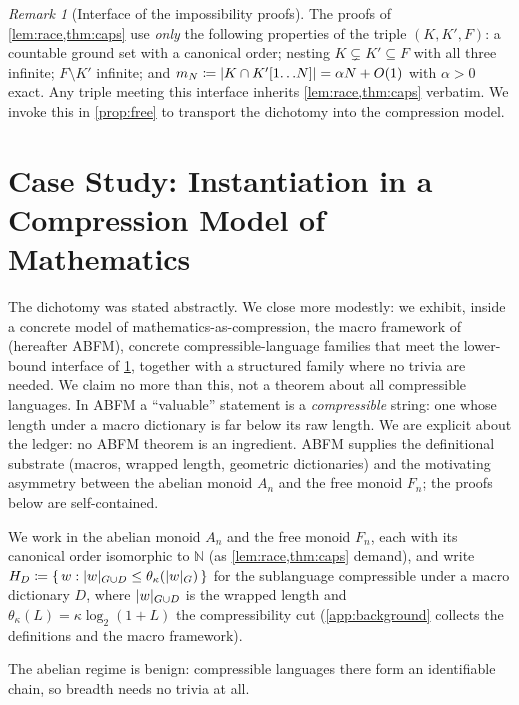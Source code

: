 \documentclass[11pt]{article}
\numberwithin{equation}{section}
\newcommand{\N}{\mathbb{N}}
\newcommand{\defeq}{\coloneqq}
\DeclarePairedDelimiter{\abs}{\lvert}{\rvert}
\newcommand{\Amb}{F}
\newcommand{\Comp}[1]{H_{#1}}
\newcommand{\rest}[2]{#1[1\!\dots\! #2]}
\theoremstyle{plain}
\theoremstyle{definition}
\theoremstyle{remark}
\newtheorem{remark}[theorem]{Remark}
\begin{document}
\begin{remark}[Interface of the impossibility proofs]\label{rmk:interface}
The proofs of \cref{lem:race,thm:caps} use \emph{only} the following properties of the triple
$(K, K', \Amb)$: a countable ground set with a canonical order; nesting $K \subsetneq K'
\subseteq \Amb$ with all three infinite; $\Amb \setminus K'$ infinite; and $m_N \defeq \abs{K
\cap \rest{K'}{N}} = \alpha N + O(1)$ with $\alpha > 0$ exact. Any triple meeting this
interface inherits \cref{lem:race,thm:caps} verbatim. We invoke this in \cref{prop:free} to
transport the dichotomy into the compression model.
\end{remark}

\section{Case Study: Instantiation in a Compression Model of Mathematics}
\label{sec:res-instantiation}

The dichotomy was stated abstractly. We close more modestly: we exhibit, inside a concrete
model of mathematics-as-compression, the macro framework of \citet{aksenov2026compression}
(hereafter ABFM), concrete compressible-language families that meet the lower-bound interface
of \cref{rmk:interface}, together with a structured family where no trivia are needed. We
claim no more than this, not a theorem about all compressible languages. In ABFM a
``valuable'' statement is a \emph{compressible} string: one whose length under a macro
dictionary is far below its raw length. We are explicit about the ledger: no ABFM theorem is
an ingredient. ABFM supplies the definitional substrate (macros, wrapped length, geometric
dictionaries) and the motivating asymmetry between the abelian monoid $A_n$ and the free
monoid $F_n$; the proofs below are self-contained.

We work in the abelian monoid $A_n$ and the free monoid $F_n$, each with its canonical order
isomorphic to $\N$ (as \cref{lem:race,thm:caps} demand), and write $\Comp{D} \defeq \{\, w :
\abs{w}_{G \cup D} \le \theta_\kappa(\abs{w}_G)\,\}$ for the sublanguage compressible under a
macro dictionary $D$, where $\abs{w}_{G \cup D}$ is the wrapped length and $\theta_\kappa(L) =
\kappa \log_2(1+L)$ the compressibility cut (\cref{app:background} collects the definitions
and the macro framework).

The abelian regime is benign: compressible languages there form an identifiable chain, so
breadth needs no trivia at all.
\end{document}
